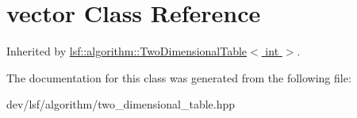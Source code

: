 \hypertarget{classstd_1_1vector}{
\section{vector Class Reference}
\label{classstd_1_1vector}
}


Inherited by \hyperlink{classlsf_1_1algorithm_1_1TwoDimensionalTable}{lsf::algorithm::TwoDimensionalTable$<$ int $>$}.

The documentation for this class was generated from the following file:\begin{DoxyCompactItemize}
\item 
dev/lsf/algorithm/two\_\-dimensional\_\-table.hpp\end{DoxyCompactItemize}
